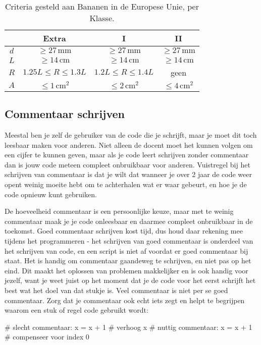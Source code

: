 \documentclass[a4paper,11pt, fleqn]{article}
\begin{document}
\begin{table}[!ht]
	\centering
	\caption{Criteria gesteld aan Bananen in de Europese Unie, per Klasse.}
	\begin{tabular}{c c c c}
		&\textbf{Extra} & \textbf{I} & \textbf{II}\\
		\hline
		$d$ & $\geq 27\,\textrm{mm}$     &$\geq 27\,\textrm{mm}$    &$\geq 27\,\textrm{mm}$\\
		$L$ & $\geq 14\,\textrm{cm}$     &$\geq 14\,\textrm{cm}$    &$\geq 14\,\textrm{cm}$\\
		$R$ & $1.25 L \leq R \leq 1.3 L$ &$1.2 L \leq R \leq 1.4 L$ & geen\\
		$A$ & $\leq 1\,\textrm{cm}^2$    &$\leq 2\,\textrm{cm}^2$   & $\leq 4\,\textrm{cm}^2$\\
		\hline
	\end{tabular}
\end{table}

\subsection{Commentaar schrijven}
Meestal ben je zelf de gebruiker van de code die je schrijft, maar je moet dit toch leesbaar maken voor anderen. Niet alleen de docent moet het kunnen volgen om een cijfer te kunnen geven, maar als je code leert schrijven zonder commentaar dan is jouw code meteen compleet onbruikbaar voor anderen. Vuistregel bij het schrijven van commentaar is dat je wilt dat wanneer je over 2 jaar de code weer opent weinig moeite hebt om te achterhalen wat er waar gebeurt, en hoe je de code opnieuw kunt gebruiken.

De hoeveelheid commentaar is een persoonlijke keuze, maar met te weinig commentaar maak je je code onleesbaar en daarmee compleet onbruikbaar in de toekomst. Goed commentaar schrijven kost tijd, dus houd daar rekening mee tijdens het programmeren - het schrijven van goed commentaar is onderdeel van het schrijven van code, en een script is niet af voordat er goed commentaar bij staat. Het is handig om commentaar gaandeweg te schrijven, en niet pas op het eind. Dit maakt het oplossen van problemen makkelijker en is ook handig voor jezelf, want je weet juist op het moment dat je de code voor het eerst schrijft het best wat het doel van dat stukje is.
Veel commentaar is niet per se goed commentaar. Zorg dat je commentaar ook echt iets zegt en helpt te begrijpen waarom een stuk of regel code gebruikt wordt:
\begin{python}
	# slecht commentaar:
	x = x + 1         # verhoog x
	# nuttig commentaar:
	x = x + 1         # compenseer voor index 0
\end{python}
\end{document}
